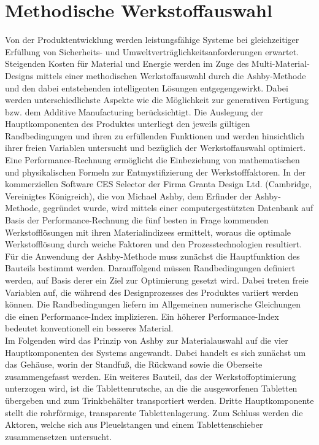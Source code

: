 
\chapter{Methodische Werkstoffauswahl}
Von der Produktentwicklung werden leistungsfähige Systeme bei gleichzeitiger Erfüllung von Sicherheits- und Umweltverträglichkeitsanforderungen erwartet. Steigenden Kosten für Material und Energie werden im Zuge des Multi-Material-Designs mittels einer methodischen Werkstoffauswahl durch die \glqq Ashby-Methode\glqq{} und den dabei entstehenden intelligenten Lösungen entgegengewirkt. Dabei werden unterschiedlichste Aspekte wie die Möglichkeit zur generativen Fertigung bzw. dem Additive Manufacturing berücksichtigt. Die Auslegung der Hauptkomponenten des Produktes unterliegt den jeweils gültigen Randbedingungen und ihren zu erfüllenden Funktionen und werden hinsichtlich ihrer freien Variablen untersucht und bezüglich der Werkstoffauswahl optimiert. Eine \glqq Performance-Rechnung\grqq{} ermöglicht die Einbeziehung von mathematischen und physikalischen Formeln zur Entmystifizierung der Werkstofffaktoren. In der kommerziellen Software CES Selector der Firma Granta Design Ltd. (Cambridge, Vereinigtes Königreich), die von Michael Ashby, dem Erfinder der Ashby-Methode, gegründet wurde, wird mittels einer computergestützten Datenbank auf Basis der Performance-Rechnung die fünf besten in Frage kommenden Werkstofflösungen mit ihren Materialindizees ermittelt, woraus die optimale Werkstofflösung durch \glqq weiche\grqq{} Faktoren und den Prozesstechnologien resultiert.\\
Für die Anwendung der Ashby-Methode muss zunächst die Hauptfunktion des Bauteils bestimmt werden. Darauffolgend müssen Randbedingungen definiert werden, auf Basis derer ein Ziel zur Optimierung gesetzt wird. Dabei treten freie Variablen auf, die während des Designprozesses des Produktes variiert werden können. Die Randbedingungen liefern im Allgemeinen numerische Gleichungen die einen Performance-Index implizieren. Ein höherer Performance-Index bedeutet konventionell ein besseres Material.\\
Im Folgenden wird das Prinzip von Ashby zur Materialauswahl auf die vier Hauptkomponenten des Systems angewandt. Dabei handelt es sich zunächst um das Gehäuse, worin der Standfuß, die Rückwand sowie die Oberseite zusammengefasst werden. Ein weiteres Bauteil, das der Werkstoffoptimierung unterzogen wird, ist die Tablettenrutsche, an die die ausgeworfenen Tabletten übergeben und zum Trinkbehälter transportiert werden. Dritte Hauptkomponente stellt die rohrförmige, transparente Tablettenlagerung. Zum Schluss werden die Aktoren, welche sich aus Pleuelstangen und einem Tablettenschieber zusammensetzen untersucht.

